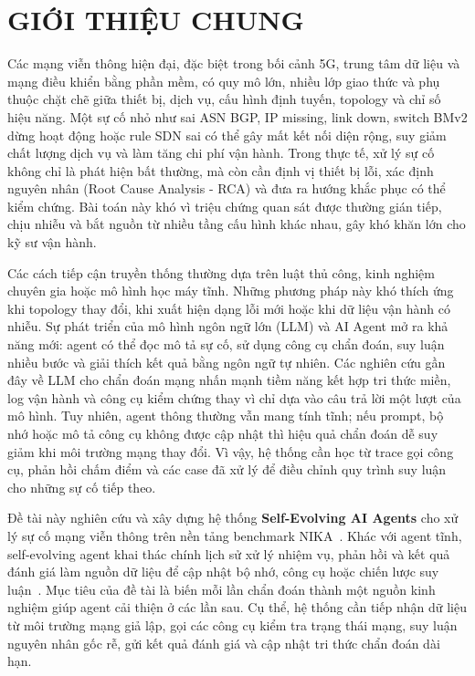 \section{GIỚI THIỆU CHUNG}

Các mạng viễn thông hiện đại, đặc biệt trong bối cảnh 5G, trung tâm dữ liệu và mạng điều khiển bằng phần mềm, có quy mô lớn, nhiều lớp giao thức và phụ thuộc chặt chẽ giữa thiết bị, dịch vụ, cấu hình định tuyến, topology và chỉ số hiệu năng. Một sự cố nhỏ như sai ASN BGP, IP missing, link down, switch BMv2 dừng hoạt động hoặc rule SDN sai có thể gây mất kết nối diện rộng, suy giảm chất lượng dịch vụ và làm tăng chi phí vận hành. Trong thực tế, xử lý sự cố không chỉ là phát hiện bất thường, mà còn cần định vị thiết bị lỗi, xác định nguyên nhân (Root Cause Analysis - RCA) và đưa ra hướng khắc phục có thể kiểm chứng. Bài toán này khó vì triệu chứng quan sát được thường gián tiếp, chịu nhiễu và bắt nguồn từ nhiều tầng cấu hình khác nhau, gây khó khăn lớn cho kỹ sư vận hành.

Các cách tiếp cận truyền thống thường dựa trên luật thủ công, kinh nghiệm chuyên gia hoặc mô hình học máy tĩnh. Những phương pháp này khó thích ứng khi topology thay đổi, khi xuất hiện dạng lỗi mới hoặc khi dữ liệu vận hành có nhiễu. Sự phát triển của mô hình ngôn ngữ lớn (LLM) và AI Agent mở ra khả năng mới: agent có thể đọc mô tả sự cố, sử dụng công cụ chẩn đoán, suy luận nhiều bước và giải thích kết quả bằng ngôn ngữ tự nhiên. Các nghiên cứu gần đây về LLM cho chẩn đoán mạng nhấn mạnh tiềm năng kết hợp tri thức miền, log vận hành và công cụ kiểm chứng thay vì chỉ dựa vào câu trả lời một lượt của mô hình. Tuy nhiên, agent thông thường vẫn mang tính tĩnh; nếu prompt, bộ nhớ hoặc mô tả công cụ không được cập nhật thì hiệu quả chẩn đoán dễ suy giảm khi môi trường mạng thay đổi. Vì vậy, hệ thống cần học từ trace gọi công cụ, phản hồi chấm điểm và các case đã xử lý để điều chỉnh quy trình suy luận cho những sự cố tiếp theo.

Đề tài này nghiên cứu và xây dựng hệ thống \textbf{Self-Evolving AI Agents} cho xử lý sự cố mạng viễn thông trên nền tảng benchmark NIKA~\citep{nika_arena2025}. Khác với agent tĩnh, self-evolving agent khai thác chính lịch sử xử lý nhiệm vụ, phản hồi và kết quả đánh giá làm nguồn dữ liệu để cập nhật bộ nhớ, công cụ hoặc chiến lược suy luận~\citep{selfevolving2025}. Mục tiêu của đề tài là biến mỗi lần chẩn đoán thành một nguồn kinh nghiệm giúp agent cải thiện ở các lần sau. Cụ thể, hệ thống cần tiếp nhận dữ liệu từ môi trường mạng giả lập, gọi các công cụ kiểm tra trạng thái mạng, suy luận nguyên nhân gốc rễ, gửi kết quả đánh giá và cập nhật tri thức chẩn đoán dài hạn.

